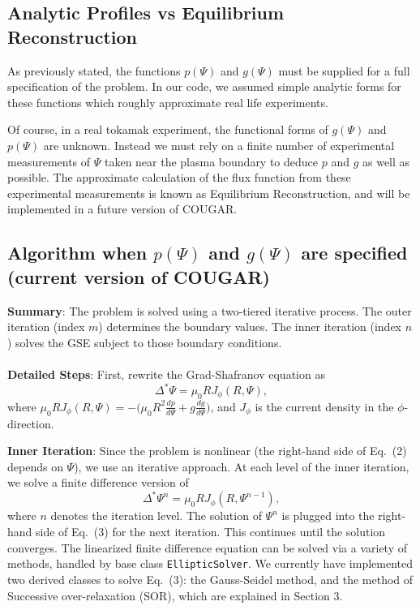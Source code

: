 \documentclass[paper=letter, fontsize=11pt]{scrartcl} %
\begin{document}
\subsection{Analytic Profiles vs Equilibrium Reconstruction}
As previously stated, the functions $p(\Psi)$ and $g(\Psi)$ must be supplied for a full specification of the problem.  In our code, we assumed simple analytic forms for these functions which roughly approximate real life experiments.  

Of course, in a real tokamak experiment, the functional forms of $g(\Psi)$ and $p(\Psi)$ are unknown.  Instead we must rely on a finite number of experimental measurements of $\Psi$ taken near the plasma boundary to deduce $p$ and $g$ as well as possible.  The approximate calculation of the flux function from these experimental measurements is known as Equilibrium Reconstruction, and will be implemented in a future version of COUGAR.  

\subsection{Algorithm when $p(\Psi)$ and $g(\Psi)$ are specified (current version of COUGAR)}

\textbf{Summary}: The problem is solved using a two-tiered iterative process.  The outer iteration (index $m$) determines the boundary values.  The inner iteration (index $n$) solves the GSE subject to those boundary conditions.
\\ \\
\textbf{Detailed Steps}: First, rewrite the Grad-Shafranov equation as
\begin{equation}
\Delta^{*}\Psi = \mu_0 R J_{\phi} (R, \Psi),
\end{equation}
where $\mu_0 R J_{\phi} (R,\Psi) = - \big(\mu_0 R^2 \frac{d p}{d\Psi} + g \frac{d g}{d\Psi}\big)$, and $J_{\phi}$ is the current density in the $\phi$-direction.

\textbf{Inner Iteration}: Since the problem is nonlinear (the right-hand side of Eq.~(2) depends on $\Psi$), we use an iterative approach.  At each level of the inner iteration, we solve a finite difference version of 
\begin{equation}
\Delta^{*}\Psi^{n} = \mu_0 R J_\phi (R, \Psi^{n-1}),
\end{equation}
where $n$ denotes the iteration level. The solution of $\Psi^n$ is plugged into the right-hand side of Eq.~(3) for the next iteration.  This continues until the solution converges.  The linearized finite difference equation can be solved via a variety of methods, handled by base class \texttt{EllipticSolver}.  We currently have implemented two derived classes to solve Eq.~(3): the Gauss-Seidel method, and the method of Successive over-relaxation (SOR), which are explained in Section 3.  
\end{document}
